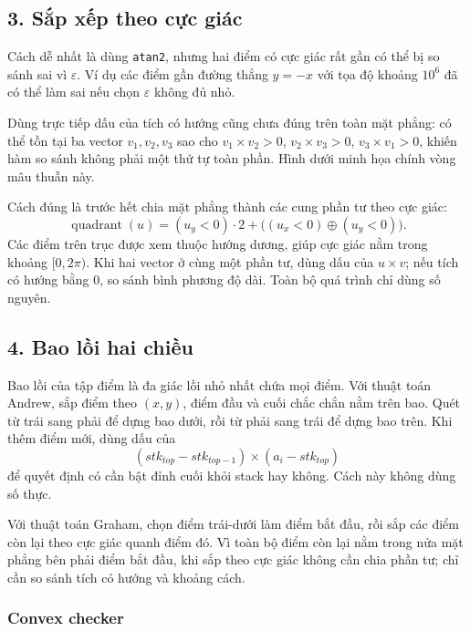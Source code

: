 \documentclass[11pt]{article}
\begin{document}
\subsection*{3. Sắp xếp theo cực giác}

Cách dễ nhất là dùng \texttt{atan2}, nhưng hai điểm có cực giác rất gần có thể
bị so sánh sai vì \(\varepsilon\). Ví dụ các điểm gần đường thẳng \(y=-x\) với
tọa độ khoảng \(10^6\) đã có thể làm sai nếu chọn \(\varepsilon\) không đủ nhỏ.

Dùng trực tiếp dấu của tích có hướng cũng chưa đúng trên toàn mặt phẳng: có
thể tồn tại ba vector \(v_1,v_2,v_3\) sao cho \(v_1\times v_2>0\),
\(v_2\times v_3>0\), \(v_3\times v_1>0\), khiến hàm so sánh không phải một thứ
tự toàn phần. Hình dưới minh họa chính vòng mâu thuẫn này.


Cách đúng là trước hết chia mặt phẳng thành các cung phần tư theo cực giác:
\[
  \operatorname{quadrant}(u)
  =
  (u_y<0)\cdot 2 + \bigl((u_x<0)\oplus(u_y<0)\bigr).
\]
Các điểm trên trục được xem thuộc hướng dương, giúp cực giác nằm trong khoảng
\([0,2\pi)\). Khi hai vector ở cùng một phần tư, dùng dấu của \(u\times v\);
nếu tích có hướng bằng \(0\), so sánh bình phương độ dài. Toàn bộ quá trình chỉ
dùng số nguyên.

\subsection*{4. Bao lồi hai chiều}

Bao lồi của tập điểm là đa giác lồi nhỏ nhất chứa mọi điểm. Với thuật toán
Andrew, sắp điểm theo \((x,y)\), điểm đầu và cuối chắc chắn nằm trên bao. Quét
từ trái sang phải để dựng bao dưới, rồi từ phải sang trái để dựng bao trên.
Khi thêm điểm mới, dùng dấu của
\[
  (stk_{top}-stk_{top-1})\times(a_i-stk_{top})
\]
để quyết định có cần bật đỉnh cuối khỏi stack hay không. Cách này không dùng
số thực.

Với thuật toán Graham, chọn điểm trái-dưới làm điểm bắt đầu, rồi sắp các điểm
còn lại theo cực giác quanh điểm đó. Vì toàn bộ điểm còn lại nằm trong nửa mặt
phẳng bên phải điểm bắt đầu, khi sắp theo cực giác không cần chia phần tư; chỉ
cần so sánh tích có hướng và khoảng cách.

\subsubsection*{Convex checker}
\end{document}
